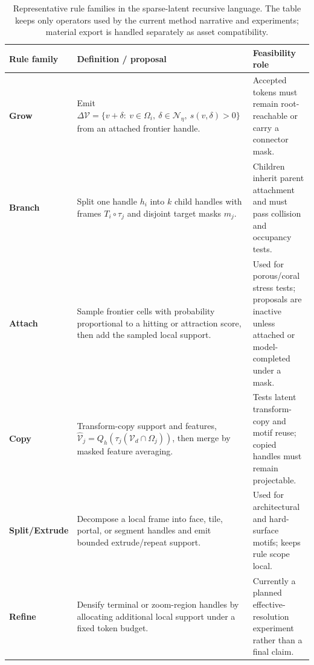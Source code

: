 \documentclass[sigconf,anonymous,review]{acmart}
\begin{document}
\begin{table}[t]
  \centering
  \caption{Representative rule families in the sparse-latent recursive language. The table keeps only operators used by the current method narrative and experiments; material export is handled separately as asset compatibility.}
  \label{tab:rule-families}
  \begin{tabular}{@{}p{}p{}p{}@{}}
    \toprule
    Rule family & Definition / proposal & Feasibility role \\
    \midrule
    \textbf{Grow} & Emit $\Delta\mathcal V=\{v+\delta:\ v\in\Omega_i,\ \delta\in\mathcal N_\eta,\ s(v,\delta)>0\}$ from an attached frontier handle. & Accepted tokens must remain root-reachable or carry a connector mask. \\
    \textbf{Branch} & Split one handle $h_i$ into $k$ child handles with frames $T_i\circ\tau_j$ and disjoint target masks $m_j$. & Children inherit parent attachment and must pass collision and occupancy tests. \\
    \textbf{Attach} & Sample frontier cells with probability proportional to a hitting or attraction score, then add the sampled local support. & Used for porous/coral stress tests; proposals are inactive unless attached or model-completed under a mask. \\
    \textbf{Copy} & Transform-copy support and features, $\widehat{\mathcal V}_j=Q_h(\tau_j(\mathcal V_d\cap\Omega_j))$, then merge by masked feature averaging. & Tests latent transform-copy and motif reuse; copied handles must remain projectable. \\
    \textbf{Split/Extrude} & Decompose a local frame into face, tile, portal, or segment handles and emit bounded extrude/repeat support. & Used for architectural and hard-surface motifs; keeps rule scope local. \\
    \textbf{Refine} & Densify terminal or zoom-region handles by allocating additional local support under a fixed token budget. & Currently a planned effective-resolution experiment rather than a final claim. \\
    \bottomrule
  \end{tabular}
\end{table}
\end{document}
